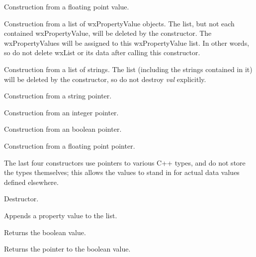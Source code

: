 Construction from a floating point value.


Construction from a list of wxPropertyValue objects. The
list, but not each contained wxPropertyValue, will be deleted
by the constructor. The wxPropertyValues will be assigned to
this wxPropertyValue list. In other words, so do not delete wxList or
its data after calling this constructor.


Construction from a list of strings. The list (including the strings
contained in it) will be deleted by the constructor, so do not
destroy {\it val} explicitly.


Construction from a string pointer.


Construction from an integer pointer.


Construction from an boolean pointer.


Construction from a floating point pointer.

The last four constructors use pointers to various C++ types, and do not
store the types themselves; this allows the values to stand in for actual
data values defined elsewhere.



Destructor.



Appends a property value to the list.



Returns the boolean value.



Returns the pointer to the boolean value.

